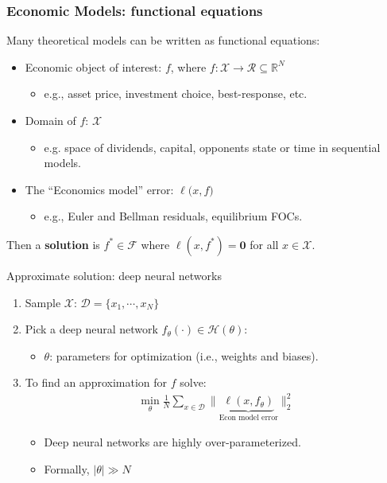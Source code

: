 \documentclass[aspectratio=169,10pt]{beamer}
\newcommand{\emphcolor}[1]{\textbf{\textcolor{emphcolorval}{#1}}}
\newcommand{\Xdom}{\mathcal{X}}
\newcommand{\F}{\mathcal{F}}
\begin{document}
\begin{frame}
	\frametitle{Economic Models: functional equations}
	Many theoretical models can be written as functional equations:
	\begin{itemize}
		\item Economic object of interest: $f $, where $f : \Xdom\to \mathcal{R}\subseteq \mathbb{R}^N$ 
		\begin{itemize}
			\item e.g., asset price, investment choice, best-response, etc.
		\end{itemize}
			\vspace{0.1in}
		\item Domain of $f$: $\Xdom$  
		\begin{itemize}
			\item e.g. space of dividends, capital, opponents state or time in sequential models.
		\end{itemize}
			\vspace{0.1in}
		\item The ``Economics model'' error:  $\ell \big(x,f\big)$  
		\begin{itemize}
			\item e.g., Euler and Bellman residuals, equilibrium FOCs.
		\end{itemize}
		\vspace{0.1in}
	\end{itemize}
	Then a \emphcolor{solution} is $f^*\in \F$ where $\ell(x,f^*) = \mathbf{0}$ for all $x \in \Xdom$.\vspace{0.1in}
\end{frame}

\begin{frame}{Approximate solution: deep neural networks }
	\begin{enumerate}
		\item Sample $\mathcal{X}$: $\mathcal{D} = \{x_1,\cdots,x_N\}$
		\vspace{0.025in}
		\item Pick a deep neural network $f_\theta(\cdot) \in \mathcal{H}(\theta)$:
		\begin{itemize}
			\item $\theta$: parameters for optimization (i.e., weights and biases).  
		\end{itemize}
		\vspace{0.025in}
		\item To find an approximation for $f$ solve:
		\begin{align*}
			\min_{\theta } \frac{1}{N}\sum_{x \in \mathcal{D}} \|\underbrace{\ell(x,f_\theta)}_{\text{Econ model error}}\|_2^2
		\end{align*}
		\begin{itemize}
			\item Deep neural networks are highly over-parameterized.
			\item Formally, $|\theta|\gg N$ 
		\end{itemize}
	\end{enumerate}
\end{frame}
\end{document}
